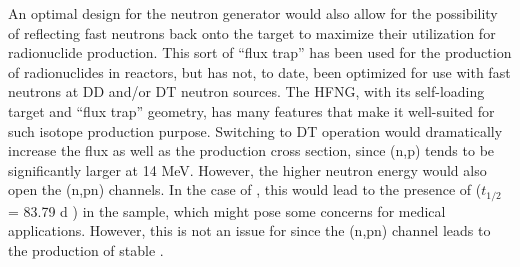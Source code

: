  
% 
% 
% 
% 
% 
% 
% 



An optimal design for the neutron generator would also allow for the possibility of reflecting fast neutrons back onto the target to maximize their utilization for radionuclide production.
 This sort of \enquote{flux trap} has been used for the production of radionuclides in reactors, but has not, to date, been optimized for use with fast neutrons  at DD and/or DT neutron sources.
 The HFNG, with its self-loading target and \enquote{flux trap} geometry, has many features that make it well-suited for such isotope production purpose.
 Switching to DT operation would dramatically increase the flux as well as the production cross section, since (n,p) tends to be significantly larger at 14 MeV.
 However, the higher neutron energy would also open the (n,pn) channels.
 In the case of , this would lead to the presence of  ($t_{1/2}$ = 83.79 d \cite{Wu2000}) in the sample, which might pose some concerns for medical applications.
 However, this is not an issue for  since the (n,pn) channel leads to the production of stable .
 
